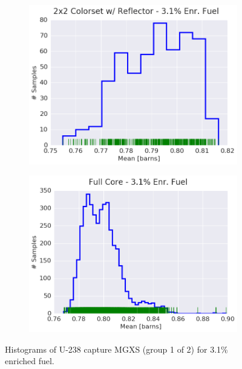 \begin{figure}[h!]
\begin{subfigure}{0.5\textwidth}
  \includegraphics[width=\linewidth]{figures/patterns/reflector/hist-kde-rug/31-enr-capt-1}  \caption{}
  \label{fig:chap9-hist-reflector-3.1-capt}
\end{subfigure}%
\begin{subfigure}{0.5\textwidth}
  \centering
  \includegraphics[width=\linewidth]{figures/patterns/full-core/hist-kde-rug/31-enr-capt-1} \caption{}
  \label{fig:chap9-hist-full-core-3.1-capt}
\end{subfigure}
\caption[Histogram of U-238 capture MGXS for 3.1\% enriched fuel]{Histograms of U-238 capture \ac{MGXS} (group 1 of 2) for 3.1\% enriched fuel.}
\label{fig:chap9-hist-3.1-capt}
\end{figure}

